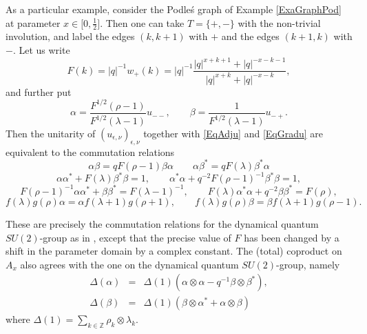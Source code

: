 \documentclass[11pt]{article}
\newcommand{\Z}{\mathbb{Z}}
\theoremstyle{definition}
\numberwithin{equation}{section}
\begin{document}
As a particular example, consider the Podle\'{s} graph of Example \ref{ExaGraphPod} at parameter $x\in \lbrack 0,\frac{1}{2}\rbrack$. Then one can take $T = \{+,-\}$ with the non-trivial involution, and label the edges $(k,k+1)$ with $+$ and the edges $(k+1,k)$ with $-$. Let us write \[F(k) = |q|^{-1}w_+(k) =  |q|^{-1}\frac{|q|^{x+k+1}+|q|^{-x-k-1}}{|q|^{x+k}+|q|^{-x-k}},\] and further put\[\alpha = \frac{F^{1/2}(\rho-1)}{F^{1/2}(\lambda-1)}u_{--},\qquad \beta = \frac{1}{F^{1/2}(\lambda-1)}u_{-+}.\] Then the unitarity of $(u_{\epsilon,\nu})_{\epsilon,\nu}$ together with \eqref{EqAdju} and \eqref{EqGradu} are equivalent to the commutation relations \begin{equation}\label{EqqCom} \alpha \beta = qF(\rho-1)\beta\alpha \qquad \alpha\beta^* = qF(\lambda)\beta^*\alpha\end{equation} \begin{equation}\label{EqDet} \alpha\alpha^* +F(\lambda)\beta^*\beta = 1,\qquad \alpha^*\alpha+q^{-2}F(\rho-1)^{-1}\beta^*\beta = 1,\end{equation}\begin{equation*} F(\rho-1)^{-1}\alpha\alpha^* +\beta\beta^* = F(\lambda-1)^{-1},\qquad  F(\lambda)\alpha^*\alpha +q^{-2}\beta\beta^* = F(\rho),\end{equation*} \begin{equation}\label{EqGrad} f(\lambda)g(\rho)\alpha =
\alpha f(\lambda+1)g(\rho+1),\qquad f(\lambda)g(\rho)\beta = \beta f(\lambda+1)g(\rho-1).\end{equation}%

These are precisely the commutation relations for the dynamical quantum $SU(2)$-group as in \cite[Definition 2.6]{KoR1}, except that the precise value of $F$ has been changed by a shift in the parameter domain by a complex constant. The (total) coproduct on $A_x$ also agrees with the one on the dynamical quantum $SU(2)$-group, namely \begin{eqnarray*} \Delta(\alpha) &=& \Delta(1) (\alpha\otimes \alpha - q^{-1}\beta\otimes \beta^*),\\ \Delta(\beta) &=& \Delta(1)(\beta\otimes \alpha^* +\alpha\otimes \beta)\end{eqnarray*} where $\Delta(1) = \sum_{k\in \Z} \rho_k\otimes \lambda_k$.




%
%

\end{document}
